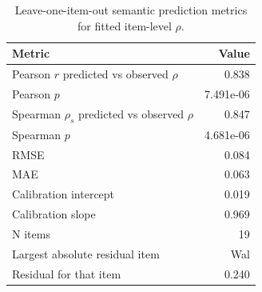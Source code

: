 \begin{table}[htbp]
\centering
\caption{Leave-one-item-out semantic prediction metrics for fitted item-level $\rho$.}
\label{tab:semantic-loocv-metrics}
\begin{tabular}{lr}
\toprule
Metric & Value \\
\midrule
Pearson $r$ predicted vs observed $\rho$ & 0.838 \\
Pearson $p$ & 7.491e-06 \\
Spearman $\rho_s$ predicted vs observed $\rho$ & 0.847 \\
Spearman $p$ & 4.681e-06 \\
RMSE & 0.084 \\
MAE & 0.063 \\
Calibration intercept & 0.019 \\
Calibration slope & 0.969 \\
N items & 19 \\
Largest absolute residual item & Wal \\
Residual for that item & 0.240 \\
\bottomrule
\end{tabular}
\end{table}
